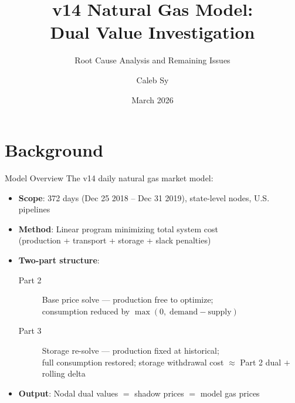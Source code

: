 \documentclass[aspectratio=169, 11pt]{beamer}
\title{v14 Natural Gas Model:\\Dual Value Investigation}
\subtitle{Root Cause Analysis and Remaining Issues}
\author{Caleb Sy}
\date{March 2026}
\institute{PhD Research Briefing}
\begin{document}
\maketitle


\section{Background}

\begin{frame}{Model Overview}
  The v14 daily natural gas market model:
  \begin{itemize}
    \item \textbf{Scope}: 372 days (Dec 25 2018 -- Dec 31 2019), state-level nodes, U.S. pipelines
    \item \textbf{Method}: Linear program minimizing total system cost \\
      (production + transport + storage + slack penalties)
    \item \textbf{Two-part structure}:
      \begin{description}
        \item[Part 2] Base price solve --- production free to optimize; \\
          consumption reduced by $\max(0,\;\text{demand} - \text{supply})$
        \item[Part 3] Storage re-solve --- production fixed at historical; \\
          full consumption restored; storage withdrawal cost $\approx$ Part 2 dual $+$ rolling delta
      \end{description}
    \item \textbf{Output}: Nodal dual values $=$ shadow prices $=$ model gas prices
  \end{itemize}
\end{frame}
\end{document}
